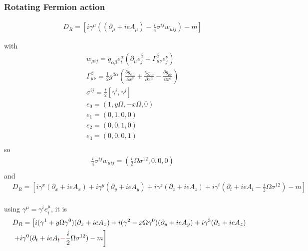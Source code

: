 \subsubsection{\label{sec:RotatingFermionAction}Rotating Fermion action}

\begin{equation}
\begin{split}
&D_R=\left[i\gamma ^{\mu}\left((\partial _{\mu}+ieA_{\mu})-\frac{i}{4}\sigma ^{ij}w_{\mu ij}\right)-m\right]
\end{split}
\end{equation}

with
\begin{equation}
\begin{split}
&w_{\mu ij}=g_{\alpha \beta}e_i^{\alpha}(\partial _{\mu}e_j^{\beta}+\Gamma ^{\beta}_{\mu\nu}e_j^{\nu})\\
&\Gamma ^{\beta}_{\mu\nu}=\frac{1}{2}g^{\beta \alpha}\left(\frac{\partial g _{\alpha \mu}}{\partial x ^{\nu}}+\frac{\partial g _{\alpha \nu}}{\partial x ^{\mu}}-\frac{\partial g_{\mu\nu}}{\partial x^{\alpha}}\right)\\
&\sigma ^{ij}=\frac{i}{2}[\gamma ^i,\gamma ^j]\\
&e_0=(1,y\Omega,-x\Omega,0)\\
&e_1=(0,1,0,0)\\
&e_2=(0,0,1,0)\\
&e_3=(0,0,0,1)\\
\end{split}
\end{equation}
so
\textcolor[rgb]{0,0,1}{
\begin{equation}
\begin{split}
&\frac{i}{4}\sigma ^{ij}w_{\mu ij}=\left(\frac{i}{2}\Omega \sigma ^{12},0,0,0\right)\\
\end{split}
\end{equation}}
and
\begin{equation}
\begin{split}
&D_R=\left[i\gamma ^x (\partial _x+ieA_x)+i\gamma ^y (\partial _y+ieA_y)+i\gamma ^z (\partial _z+ieA_z)+i\gamma ^t (\partial _t+ieA_t-\frac{i}{2}\Omega \sigma ^{12})-m\right]\\
\end{split}
\end{equation}

using $\gamma ^{\mu}=\gamma ^i e_i^{\mu}$, it is
\begin{equation}
\begin{split}
&D_R=\left[i(\gamma ^1+y\Omega \gamma^0) (\partial _x+ieA_x)+i(\gamma ^2-x\Omega \gamma^0) (\partial _y+ieA_y)+i\gamma ^3 (\partial _z+ieA_z)\right.\\
&\left.+i\gamma ^0 (\partial _t+ieA_t\textcolor[rgb]{1,0,0}{-}\frac{i}{2}\Omega \sigma ^{12})-m\right]\\
\end{split}
\end{equation}


